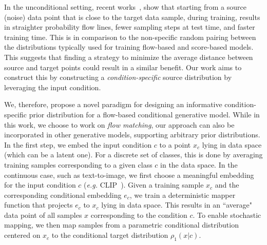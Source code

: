 In the unconditional setting, recent works~\citep{pooladian2023multisample, tong2023improving}, show that starting from a source (noise) data point that is close to the target data sample, during training, results in straighter probability flow lines, fewer sampling steps at test time, and faster training time. This is in comparison to the non-specific random pairing between the distributions typically used for training flow-based and score-based models. 
This suggests that finding a strategy to 
minimize the average distance between source and target points could result in a similar benefit. Our work aims to construct this by constructing a \emph{condition-specific} source distribution by leveraging the input condition. 


We, therefore, propose a novel paradigm for designing an informative condition-specific prior distribution for a flow-based conditional generative model. While in this work, we choose to work on \emph{flow matching}, our approach can also be incorporated in other generative models, supporting arbitrary prior distributions.
In the first step, we embed the input condition $c$ to a point $x_c$ lying in data space (which can be a latent one). 
For a discrete set of classes, this is done by averaging training samples corresponding to a given class $c$ in the data space. In the continuous case, such as text-to-image, we first choose a meaningful embedding for the input condition $c$ (\emph{e.g.} CLIP~\cite{radford2021learning}).
Given a training sample $x_c$ and the corresponding conditional embedding $e_c$, we train a deterministic mapper function 
that projects $e_c$ to $x_c$ lying in data space. This results in an ``average" data point of all samples $x$ corresponding to the condition $c$. 
To enable stochastic mapping, we then map samples from a 
parametric conditional distribution centered on $x_c$ to the conditional target distribution $\rho_1(x|c)$. 

